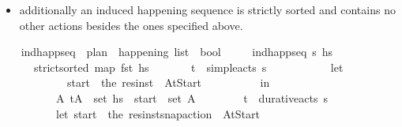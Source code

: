 \begin{isabellebody}
\begin{isamarkuptext}
\begin{itemize}
\item additionally an induced happening sequence is strictly sorted 
and contains no other actions besides the ones specified above.%
\end{itemize}%
\end{isamarkuptext}\isamarkuptrue%
\ \ \isamarkupfalse%
\ ind{\isacharunderscore}{\kern0pt}happ{\isacharunderscore}{\kern0pt}seq\ {\isacharcolon}{\kern0pt}{\isacharcolon}{\kern0pt}\ {\isachardoublequoteopen}plan\ {\isasymRightarrow}\ happening\ list\ {\isasymRightarrow}\ bool{\isachardoublequoteclose}\ \isanewline
\ \ \ \ {\isachardoublequoteopen}ind{\isacharunderscore}{\kern0pt}happ{\isacharunderscore}{\kern0pt}seq\ {\isasympi}s\ hs\ {\isasymlongleftrightarrow}\ {\isacharparenleft}{\kern0pt}\isanewline
\ \ \ \ \ \ strict{\isacharunderscore}{\kern0pt}sorted\ {\isacharparenleft}{\kern0pt}map\ fst\ hs{\isacharparenright}{\kern0pt}\isanewline
\ \ \ \ \ \ {\isasymand}\ {\isacharparenleft}{\kern0pt}{\isasymforall}{\isacharparenleft}{\kern0pt}t\isactrlsub {\isasympi}{\isacharcomma}{\kern0pt}{\isasympi}{\isacharparenright}{\kern0pt}\ {\isasymin}\ simple{\isacharunderscore}{\kern0pt}acts\ {\isasympi}s{\isachardot}{\kern0pt}\ \isanewline
\ \ \ \ \ \ \ \ \ \ let\ \isanewline
\ \ \ \ \ \ \ \ \ \ \ \ {\isasympi}\isactrlsub s\isactrlsub t\isactrlsub a\isactrlsub r\isactrlsub t\ {\isacharequal}{\kern0pt}\ the\ {\isacharparenleft}{\kern0pt}res{\isacharunderscore}{\kern0pt}inst\ {\isasympi}\ At{\isacharunderscore}{\kern0pt}Start{\isacharparenright}{\kern0pt}\isanewline
\ \ \ \ \ \ \ \ \ \ in\isanewline
\ \ \ \ \ \ \ \ \ \ {\isasymexists}A{\isachardot}{\kern0pt}\ {\isacharparenleft}{\kern0pt}t\isactrlsub {\isasympi}{\isacharcomma}{\kern0pt}A{\isacharparenright}{\kern0pt}\ {\isasymin}\ set\ hs\ {\isasymand}\ {\isasympi}\isactrlsub s\isactrlsub t\isactrlsub a\isactrlsub r\isactrlsub t\ {\isasymin}\ set\ A{\isacharparenright}{\kern0pt}\ \isanewline
\ \ \ \ \ \ {\isasymand}\ {\isacharparenleft}{\kern0pt}{\isasymforall}{\isacharparenleft}{\kern0pt}t\isactrlsub {\isasympi}{\isacharcomma}{\kern0pt}{\isasympi}{\isacharparenright}{\kern0pt}\ {\isasymin}\ durative{\isacharunderscore}{\kern0pt}acts\ {\isasympi}s{\isachardot}{\kern0pt}\ \isanewline
\ \ \ \ \ \ \ \ \ \ let\ {\isasympi}\isactrlsub s\isactrlsub t\isactrlsub a\isactrlsub r\isactrlsub t\ {\isacharequal}{\kern0pt}\ the\ {\isacharparenleft}{\kern0pt}res{\isacharunderscore}{\kern0pt}inst{\isacharunderscore}{\kern0pt}snap{\isacharunderscore}{\kern0pt}action\ {\isasympi}\ At{\isacharunderscore}{\kern0pt}Start{\isacharparenright}{\kern0pt}{\isacharsemicolon}{\kern0pt}\isanewline

\end{isabellebody}
